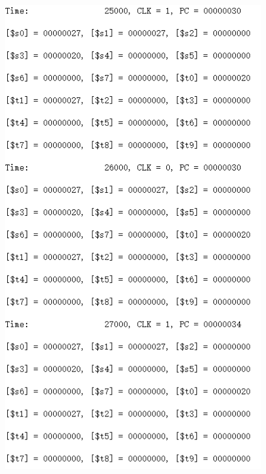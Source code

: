 \documentclass[12pt]{article}
\begin{document}
\begin{figure}[H]
\centering
\includegraphics[scale=1]{R9.jpg}
\end{figure}
\end{document}
